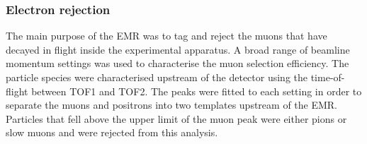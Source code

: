 \subsubsection{Electron rejection}
The main purpose of the EMR was to tag and reject the muons that have decayed in flight inside the experimental apparatus. A broad range of beamline momentum settings
was used to characterise the muon selection efficiency. The particle species were characterised upstream of the detector using the time-of-flight between TOF1 and TOF2.
The peaks were fitted to each setting in order to separate the muons and positrons into two templates upstream of the EMR. Particles that fell above the upper limit of the muon peak were either pions or slow muons and were rejected from this analysis.

